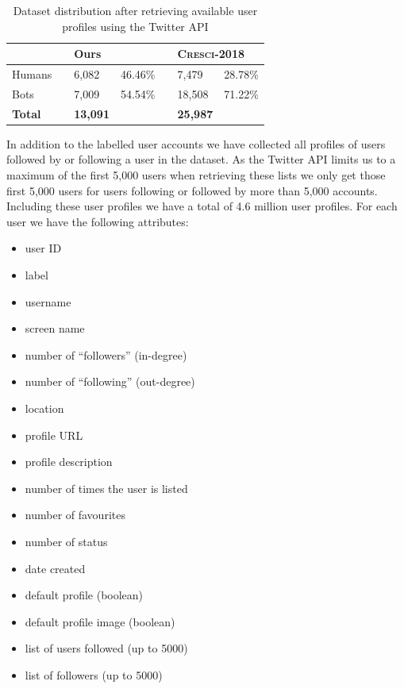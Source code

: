 \begin{table}[]
\centering
\begin{tabular}{@{}lllllll@{}}
\toprule
       &  & \multicolumn{2}{l}{Ours} &  & \multicolumn{2}{l}{\textsc{Cresci-2018}} \\ \midrule
Humans &  & 6,082       & 46.46\%     &  & 7,479          & 28.78\%         \\
Bots   &  & 7,009       & 54.54\%     &  & 18,508         & 71.22\%         \\ \midrule
\textbf{Total}  &  & \textbf{13,091}      &        &  & \textbf{25,987}         &            \\ \bottomrule
\end{tabular}
\caption{Dataset distribution after retrieving available user profiles using the Twitter API}
\label{tab:dataset}
\end{table}

In addition to the labelled user accounts we have collected all profiles of users followed by or following a user in the dataset. As the Twitter API limits us to a maximum of the first 5,000 users when retrieving these lists we only get those first 5,000 users for users following or followed by more than 5,000 accounts. Including these user profiles we have a total of 4.6 million user profiles. For each user we have the following attributes:

\begin{multicols}{2}
\begin{itemize}
    \item user ID
    \item label
    \item username
    \item screen name
    \item number of “followers” (in-degree)
    \item number of “following” (out-degree)
    \item location
    \item profile URL
    \item profile description
    \item number of times the user is listed
    \item number of favourites
    \item number of status
    \item date created
    \item default profile (boolean)
    \item default profile image (boolean)
    \item list of users followed (up to 5000)
    \item list of followers (up to 5000)
\end{itemize}
\end{multicols}


